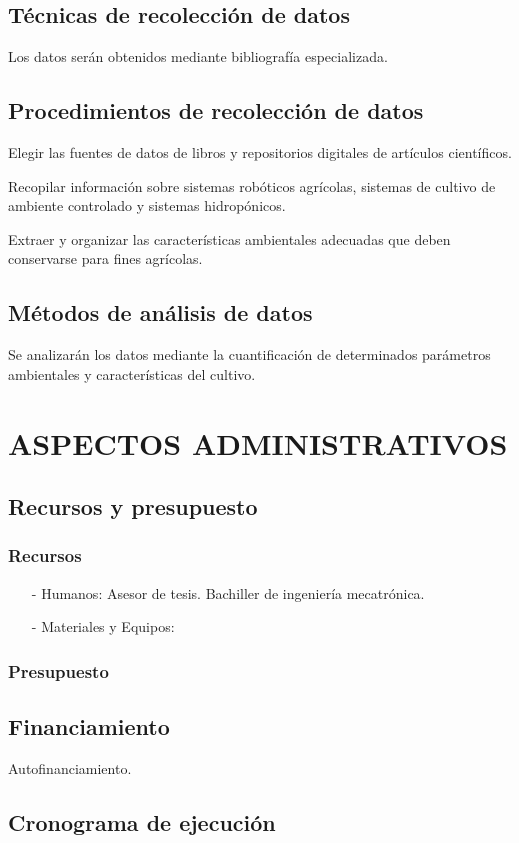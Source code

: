 \documentclass{report}
\begin{document}
\section{Técnicas de recolección de datos}
Los datos serán obtenidos mediante bibliografía especializada.
\section{Procedimientos de recolección de datos}
Elegir las fuentes de datos de libros y repositorios digitales de artículos
científicos.

Recopilar información sobre sistemas robóticos agrícolas, sistemas de cultivo de
ambiente controlado y sistemas hidropónicos.

Extraer y organizar las características ambientales adecuadas que deben
conservarse para fines agrícolas.
\section{Métodos de análisis de datos}
Se analizarán los datos mediante la cuantificación de determinados parámetros
ambientales y características del cultivo.
\chapter{ASPECTOS ADMINISTRATIVOS}
\section{Recursos y presupuesto}
\subsection{Recursos}
\begin{enumerate}
\item[-] Humanos:
  Asesor de tesis.
  Bachiller de ingeniería mecatrónica.
\item[-] Materiales y Equipos:
  
\end{enumerate}
\subsection{Presupuesto}
\section{Financiamiento}
Autofinanciamiento.
\section{Cronograma de ejecución}
\end{document}

